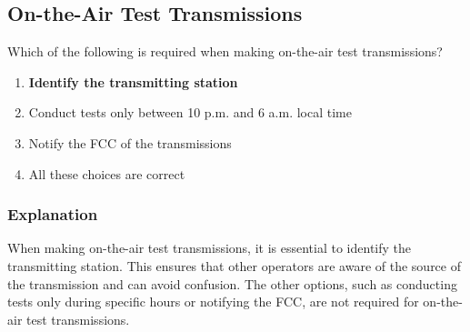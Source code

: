 \subsection{On-the-Air Test Transmissions}\label{T2A06}

\begin{tcolorbox}[colback=gray!10!white,colframe=black!75!black,title=T2A06]
Which of the following is required when making on-the-air test transmissions?
\begin{enumerate}[noitemsep]
    \item \textbf{Identify the transmitting station}
    \item Conduct tests only between 10 p.m. and 6 a.m. local time
    \item Notify the FCC of the transmissions
    \item All these choices are correct
\end{enumerate}
\end{tcolorbox}

\subsubsection*{Explanation}
When making on-the-air test transmissions, it is essential to identify the transmitting station. This ensures that other operators are aware of the source of the transmission and can avoid confusion. The other options, such as conducting tests only during specific hours or notifying the FCC, are not required for on-the-air test transmissions.
